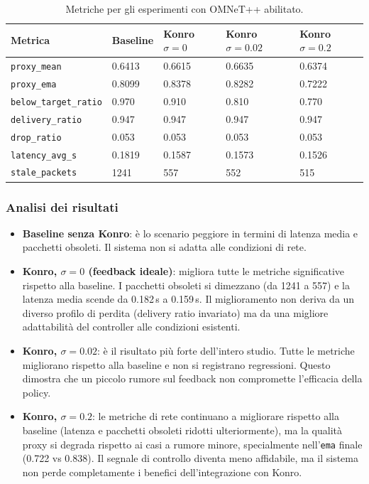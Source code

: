 \documentclass[12pt,a4paper]{article}
\begin{document}
\begin{table}[H]
  \centering
  \caption{Metriche per gli esperimenti con OMNeT++ abilitato.}
  \label{tab:omnet_enabled}
  \begin{tabular}{@{}L{4cm}R{2.2cm}R{2.2cm}R{2.2cm}R{2.2cm}@{}}
    \toprule
    Metrica & Baseline & Konro $\sigma=0$ & Konro $\sigma=0.02$ & Konro $\sigma=0.2$ \\
    \midrule
    \texttt{proxy\_mean}       & 0.6413 & 0.6615 & 0.6635 & 0.6374 \\
    \texttt{proxy\_ema}        & 0.8099 & 0.8378 & 0.8282 & 0.7222 \\
    \texttt{below\_target\_ratio} & 0.970 & 0.910 & 0.810 & 0.770 \\
    \texttt{delivery\_ratio}   & 0.947  & 0.947  & 0.947  & 0.947  \\
    \texttt{drop\_ratio}       & 0.053  & 0.053  & 0.053  & 0.053  \\
    \texttt{latency\_avg\_s}   & 0.1819 & 0.1587 & 0.1573 & 0.1526 \\
    \texttt{stale\_packets}    & 1241   & 557    & 552    & 515    \\
    \bottomrule
  \end{tabular}
\end{table}

\subsubsection{Analisi dei risultati}

\begin{itemize}
  \item \textbf{Baseline senza Konro}: \`e lo scenario peggiore in termini di
        latenza media e pacchetti obsoleti. Il sistema non si adatta alle condizioni
        di rete.

  \item \textbf{Konro, $\sigma = 0$ (feedback ideale)}: migliora tutte le metriche
        significative rispetto alla baseline. I pacchetti obsoleti si dimezzano
        (da 1241 a 557) e la latenza media scende da 0.182\,s a 0.159\,s.
        Il miglioramento non deriva da un diverso profilo di perdita (delivery ratio
        invariato) ma da una migliore adattabilit\`a del controller alle condizioni
        esistenti.

  \item \textbf{Konro, $\sigma = 0.02$}: \`e il risultato pi\`u forte dell'intero
        studio. Tutte le metriche migliorano rispetto alla baseline e non si
        registrano regressioni. Questo dimostra che un piccolo rumore sul feedback
        non compromette l'efficacia della policy.

  \item \textbf{Konro, $\sigma = 0.2$}: le metriche di rete continuano a migliorare
        rispetto alla baseline (latenza e pacchetti obsoleti ridotti ulteriormente),
        ma la qualit\`a proxy si degrada rispetto ai casi a rumore minore,
        specialmente nell'\texttt{ema} finale (0.722 vs 0.838). Il segnale di
        controllo diventa meno affidabile, ma il sistema non perde completamente
        i benefici dell'integrazione con Konro.
\end{itemize}
\end{document}

